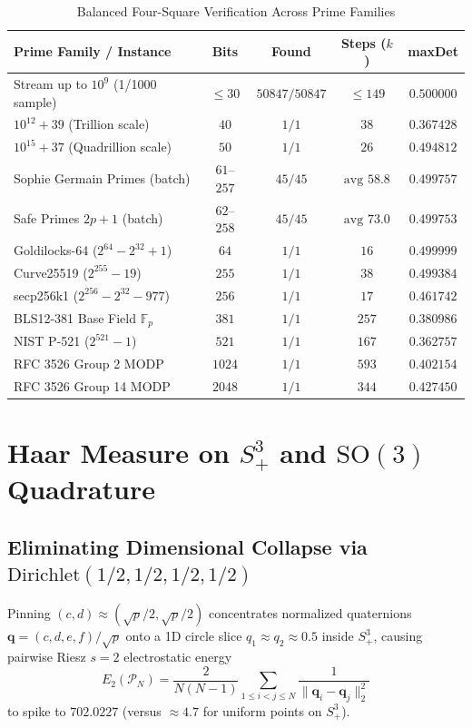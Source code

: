 \documentclass[conference]{IEEEtran}
\begin{document}
\begin{table}[t]
\caption{Balanced Four-Square Verification Across Prime Families}
\label{tab:crypto}
\centering
\begin{tabular}{@{}lcccc@{}}
\toprule
\textbf{Prime Family / Instance} & \textbf{Bits} & \textbf{Found} & \textbf{Steps ($k$)} & \textbf{maxDet} \\
\midrule
Stream up to $10^9$ (1/1000 sample) & $\le 30$ & $50847/50847$ & $\le 149$ & $0.500000$ \\
$10^{12} + 39$ (Trillion scale) & $40$ & $1/1$ & $38$ & $0.367428$ \\
$10^{15} + 37$ (Quadrillion scale) & $50$ & $1/1$ & $26$ & $0.494812$ \\
Sophie Germain Primes (batch) & $61$--$257$ & $45/45$ & $\text{avg } 58.8$ & $0.499757$ \\
Safe Primes $2p+1$ (batch) & $62$--$258$ & $45/45$ & $\text{avg } 73.0$ & $0.499753$ \\
Goldilocks-64 ($2^{64}-2^{32}+1$) & $64$ & $1/1$ & $16$ & $0.499999$ \\
Curve25519 ($2^{255}-19$) & $255$ & $1/1$ & $38$ & $0.499384$ \\
secp256k1 ($2^{256}-2^{32}-977$) & $256$ & $1/1$ & $17$ & $0.461742$ \\
BLS12-381 Base Field $\mathbb{F}_p$ & $381$ & $1/1$ & $257$ & $0.380986$ \\
NIST P-521 ($2^{521}-1$) & $521$ & $1/1$ & $167$ & $0.362757$ \\
RFC 3526 Group 2 MODP & $1024$ & $1/1$ & $593$ & $0.402154$ \\
RFC 3526 Group 14 MODP & $2048$ & $1/1$ & $344$ & $0.427450$ \\
\bottomrule
\end{tabular}
\end{table}

\section{Haar Measure on $S^3_+$ and $\mathrm{SO}(3)$ Quadrature}

\subsection{Eliminating Dimensional Collapse via $\mathrm{Dirichlet}(1/2, 1/2, 1/2, 1/2)$}
Pinning $(c, d) \approx (\sqrt{p}/2, \sqrt{p}/2)$ concentrates normalized quaternions $\mathbf{q} = (c, d, e, f)/\sqrt{p}$ onto a 1D circle slice $q_1 \approx q_2 \approx 0.5$ inside $S^3_+$, causing pairwise Riesz $s=2$ electrostatic energy
\begin{equation}
E_2(\mathcal{P}_N) = \frac{2}{N(N-1)} \sum_{1 \le i < j \le N} \frac{1}{\|\mathbf{q}_i - \mathbf{q}_j\|_2^2}
\label{eq:riesz}
\end{equation}
to spike to $702.0227$ (versus $\approx 4.7$ for uniform points on $S^3_+$).
\end{document}
